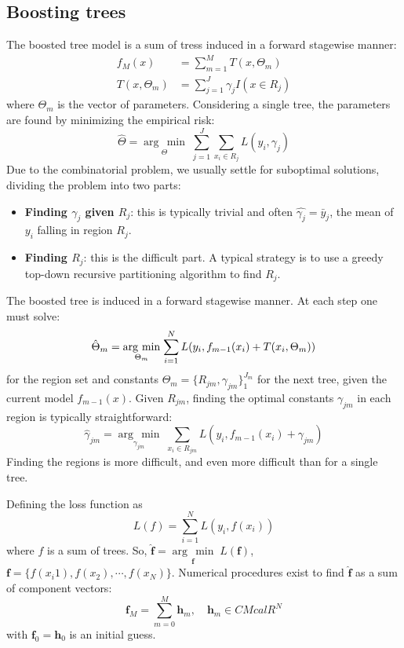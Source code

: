 \documentclass[12pt, letterpaper]{article}
\theoremstyle{definition}
\DeclarePairedDelimiter\autobracket{(}{)}
\newcommand{\br}[1]{\autobracket*{#1}}
\newcommand{\argmin}[1]{\underset{#1}{\operatorname{arg}\,\operatorname{min}}\;}
\begin{document}
\subsection{Boosting trees}
The boosted tree model is a sum of tress induced in a forward stagewise manner:
\begin{equation}
\begin{aligned}
f_M(x) &= \sum_{m=1}^M T(x, \Theta_m)\\
T(x, \Theta_m) &= \sum_{j=1}^J\gamma_j I(x \in R_j)
\end{aligned}
\end{equation}
where $\Theta_m$ is the vector of parameters. Considering a single tree, the parameters are found by minimizing the empirical risk:
\begin{equation}
\hat{\Theta} = \argmin{\Theta}{\sum_{j=1}^J\sum_{x_i \in R_j}L(y_i, \gamma_j)}
\end{equation}
Due to the combinatorial problem, we usually settle for suboptimal solutions, dividing the problem into two parts:
\begin{itemize}
\item \textbf{Finding $\gamma_j$ given $R_j$}: this is typically trivial and often $\hat{\gamma_j} = \bar{y}_j$, the mean of $y_i$ falling in region $R_j$.
\item \textbf{Finding $R_j$}: this is the difficult part. A typical strategy is to use a greedy top-down recursive partitioning  algorithm to find $R_j$.
\end{itemize}

The boosted tree is induced in a forward stagewise manner. At each step one must solve:
\begin{equation}
\hat{\Theta}_m = \argmin{\Theta_m}{\sum_{i=1}^N L\br{y_i, f_{m-1}(x_i)+T\br{x_i, \Theta_m}}}
\end{equation}
for the region set and constants $\Theta_m = \{R_{jm},\gamma_{jm}\}_1^{J_m}$ for the next tree, given the current model $f_{m-1}(x)$. Given $R_{jm}$, finding the optimal constants $\gamma_{jm}$ in each region is typically straightforward:
\begin{equation}
\hat{\gamma}_{jm} = \argmin{\gamma_{jm}}{\sum_{x_i \in R_{jm}}} L(y_i, f_{m-1}(x_i)+\gamma_{jm})
\end{equation}
Finding the regions is more difficult, and even more difficult than for a single tree.

Defining the loss function as
\begin{equation}
L(f) = \sum_{i=1}^N L(y_i, f(x_i))
\end{equation}
where $f$ is a sum of trees. So, $\hat{\mathbf{f}} =\argmin{\mathbf{f}}{L(\mathbf{f})}$, $\mathbf{f}=\{f(x_i1), f(x_2), \cdots, f(x_N)\}$. Numerical procedures exist to find $\hat{\mathbf{f}}$ as a sum of component vectors:
\begin{equation}
\mathbf{f}_M = \sum_{m=0}^M \mathbf{h}_m, \quad \mathbf{h}_m \in CMcal{R}^N
\end{equation}
with $\mathbf{f}_0=\mathbf{h}_0$ is an initial guess.
\end{document}
